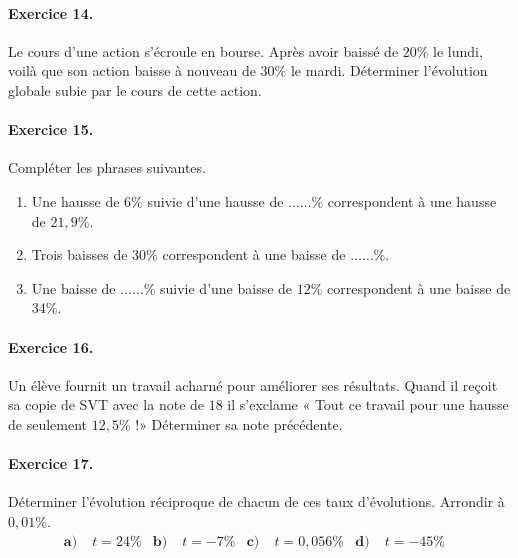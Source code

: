 \documentclass[11pt]{article}
\begin{document}
\paragraph{Exercice 14.}
Le cours d'une action s'écroule en bourse. Après avoir baissé de $20\%$ le
lundi, voilà que son action baisse à nouveau de $30\%$ le mardi. Déterminer
l'évolution globale subie par le cours de cette action.

\paragraph{Exercice 15.} Compléter les phrases suivantes.
\begin{enumerate}
  \item Une hausse de $6\%$ suivie d'une hausse de $\dots\dots\%$ correspondent
    à une hausse de $21,9\%$.
  \item Trois baisses de $30\%$ correspondent à une baisse de $\dots\dots\%$.
  \item Une baisse de $\dots\dots\%$ suivie d'une baisse de $12\%$ correspondent
    à une baisse de $34\%$.
\end{enumerate}

\paragraph{Exercice 16.} Un élève fournit un travail acharné pour améliorer ses
résultats. Quand il reçoit sa copie de SVT avec la note de $18$ il s'exclame «
Tout ce travail pour une hausse de seulement $12,5\%$ !» Déterminer sa note
précédente.\\[-9mm]
\paragraph{Exercice 17.} Déterminer l'évolution réciproque de chacun de ces taux
d'évolutions. Arrondir à $0,01\%$.
\begin{align*}
  \textbf{a)}\;& t = 24\% &
  \textbf{b)}\;& t = -7\% &
  \textbf{c)}\;& t = 0,056\% &
  \textbf{d)}\;& t = -45\% &
\end{align*}
~\\[-12mm]
\end{document}

